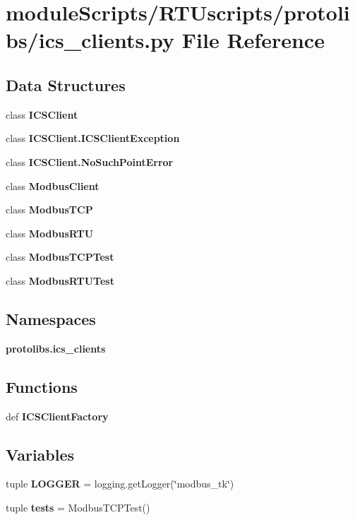 \section{module\+Scripts/\+R\+T\+Uscripts/protolibs/ics\+\_\+clients.py File Reference}
\label{ics__clients_8py}
\subsection*{Data Structures}
\begin{DoxyCompactItemize}
\item 
class {\bf I\+C\+S\+Client}
\item 
class {\bf I\+C\+S\+Client.\+I\+C\+S\+Client\+Exception}
\item 
class {\bf I\+C\+S\+Client.\+No\+Such\+Point\+Error}
\item 
class {\bf Modbus\+Client}
\item 
class {\bf Modbus\+T\+C\+P}
\item 
class {\bf Modbus\+R\+T\+U}
\item 
class {\bf Modbus\+T\+C\+P\+Test}
\item 
class {\bf Modbus\+R\+T\+U\+Test}
\end{DoxyCompactItemize}
\subsection*{Namespaces}
\begin{DoxyCompactItemize}
\item 
 {\bf protolibs.\+ics\+\_\+clients}
\end{DoxyCompactItemize}
\subsection*{Functions}
\begin{DoxyCompactItemize}
\item 
def {\bf I\+C\+S\+Client\+Factory}
\end{DoxyCompactItemize}
\subsection*{Variables}
\begin{DoxyCompactItemize}
\item 
tuple {\bf L\+O\+G\+G\+E\+R} = logging.\+get\+Logger(\char`\"{}modbus\+\_\+tk\char`\"{})
\item 
tuple {\bf tests} = Modbus\+T\+C\+P\+Test()
\end{DoxyCompactItemize}
